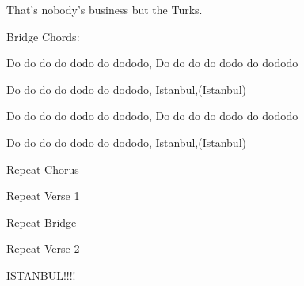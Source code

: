 That's nobody's business but the Turks.

Bridge Chords:

Do do do do dodo do dododo, Do do do do dodo do dododo

Do do do do dodo do dododo, Istanbul,(Istanbul)

Do do do do dodo do dododo, Do do do do dodo do dododo

Do do do do dodo do dododo, Istanbul,(Istanbul)

Repeat Chorus

Repeat Verse 1

Repeat Bridge

Repeat Verse 2

ISTANBUL!!!!

